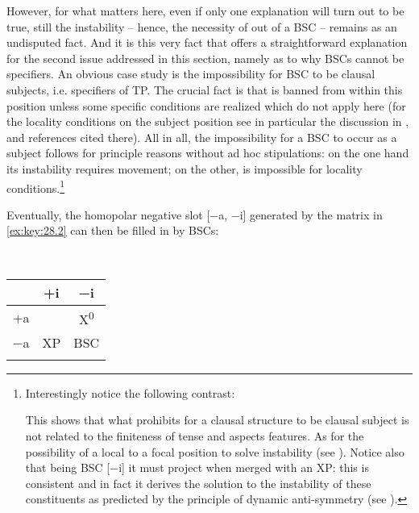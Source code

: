 \documentclass[output=paper]{langsci/langscibook}
\begin{document}
However, for what matters here, even if only one explanation will turn out to
be true, still the instability – hence, the necessity of  out of a \gls{BSC}
– remains as an undisputed fact. And it is this very fact that offers a
straightforward explanation for the second issue addressed in this section,
namely as to why \glspl{BSC} cannot be specifiers. An obvious case study is the
impossibility for \gls{BSC} to be clausal subjects, i.e. specifiers of TP.  The
crucial fact is that  is banned from within this position unless some
specific conditions are realized which do not apply here (for the locality
conditions on the subject position see in particular the discussion in
\citealt{Rizzi2015}, \citealt{Stepanov2007} and references cited there). All
in all, the impossibility for a \gls{BSC} to occur as a subject follows for principle
reasons without ad hoc stipulations: on the one hand its instability requires
movement; on the other,  is impossible for locality
conditions.\footnote{Interestingly notice the following contrast:

\begin{exe}
    \begin{xlist}
    \end{xlist}
\end{exe}

This shows that what prohibits for a clausal structure to be clausal subject is
not related to the finiteness of tense and aspects features. As for the
possibility of a local  to a focal position to solve instability (see
\citealt{Moro2009}). Notice also that being \gls{BSC} [−i] it must project when merged
with an XP\@: this is consistent and in fact it derives the solution to the
instability of these constituents as predicted by the principle of dynamic
anti-symmetry (see
\citealt{Moro2000,Moro2009,Chomsky2013,Chomsky2017,ChoGalOtt2019,Rizzi2015,Rizzi2016}).}

Eventually, the homopolar negative slot [−a, −i] generated by the matrix in
\eqref{ex:key:28.2} can then be filled in by \glspl{BSC}:

\ea\label{ex:key:28.4}\leavevmode\\[-1\baselineskip]
    \begin{tabular}{ccc}
    \lsptoprule
                & +i & −i\\
    \midrule
    +a &             & X\textsuperscript{0}\\
    −a & XP          & BSC\\
    \lspbottomrule
    \end{tabular}
\z
\end{document}

